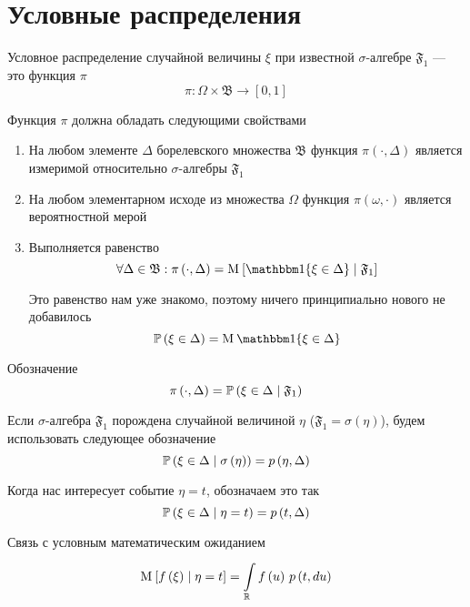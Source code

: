 \section{Условные распределения}

\begin{definition}
    Условное распределение случайной величины $\xi$
    при известной $\sigma$-алгебре $\mathfrak{F}_1$ --- это функция $\pi$
    $$\pi: \Omega \times \mathfrak{B} \rightarrow \left[ 0, 1 \right]$$
    
    Функция $\pi$ должна обладать следующими свойствами
    \begin{enumerate}
        \item На любом элементе $\Delta$ борелевского множества $\mathfrak{B}$
            функция $\pi\left( \cdot, \Delta \right)$ является измеримой
            относительно $\sigma$-алгебры $\mathfrak{F}_1$
        \item На любом элементарном исходе из множества $\Omega$
            функция $\pi\left( \omega, \cdot \right)$
            является вероятностной мерой
        \item Выполняется равенство
            $$\forall \Delta \in \mathfrak{B}: \pi\left( \cdot, \Delta \right)
                = \Mean{\Indicator{\xi \in \Delta} \mcond \mathfrak{F}_1}$$

            Это равенство нам уже знакомо, поэтому ничего принципиально нового
            не добавилось
            $$\probability{\xi \in \Delta} = \mean{\Indicator{\xi \in \Delta}}$$
    \end{enumerate}

    Обозначение
    $$\pi\left( \cdot, \Delta \right)
        = \probability{\xi \in \Delta \mcond \mathfrak{F}_1}$$

    Если $\sigma$-алгебра $\mathfrak{F}_1$ порождена случайной величиной
    $\eta$ ($\mathfrak{F}_1 = \sigma\left( \eta \right)$), будем использовать
    следующее обозначение
    $$\probability{\xi \in \Delta \mcond \sigma\left( \eta \right)}
        = \pdf{\eta, \Delta}$$

    Когда нас интересует событие $\eta = t$, обозначаем это так
    $$\probability{\xi \in \Delta \mcond \eta = t} = \pdf{t, \Delta}$$

    Связь с условным математическим ожиданием
    $$\Mean{f\left( \xi \right) \mcond \eta = t}
        = \integrall{\mathbb{R}}{\pdf{t, du}}{f\left( u \right)}$$
\end{definition}

